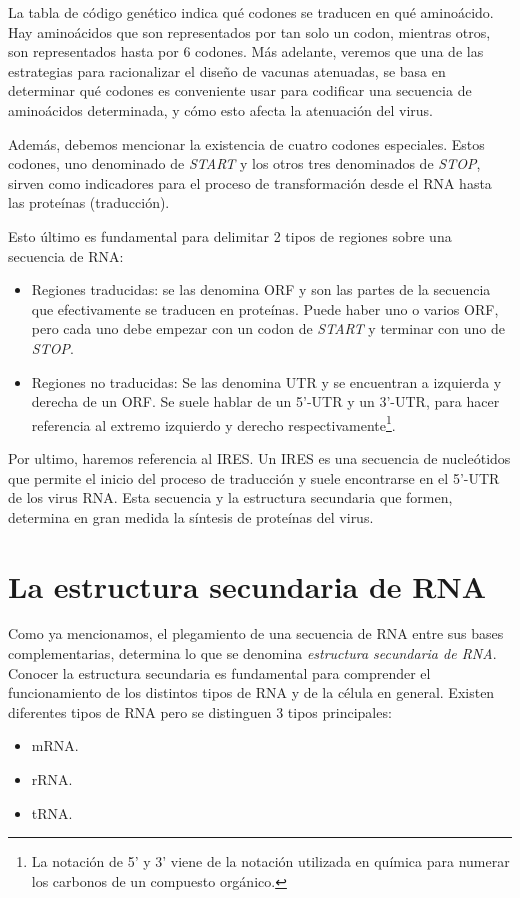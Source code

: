 La tabla de c\'odigo gen\'etico indica qu\'e codones se traducen en qu\'e
amino\'acido. Hay amino\'acidos que son representados por tan solo un codon,
mientras otros, son representados hasta por 6 codones. M\'as adelante, veremos
que una de las estrategias para racionalizar el dise\~no de vacunas atenuadas,
se basa en determinar qu\'e codones es conveniente usar para codificar una
secuencia de amino\'acidos determinada, y c\'omo esto afecta la atenuaci\'on del
virus.

Adem\'as, debemos mencionar la existencia de cuatro codones especiales. Estos
codones, uno denominado de \textit{START} y los otros tres denominados de
\textit{STOP}, sirven como indicadores para el proceso de transformaci\'on desde
el \ac{RNA} hasta las prote\'inas (traducci\'on).

Esto \'ultimo es fundamental para delimitar 2 tipos de regiones sobre una
secuencia de \ac{RNA}:
\begin{itemize}
 \item Regiones traducidas: se las denomina \ac{ORF} y son las partes de la
secuencia que efectivamente se traducen en prote\'inas. Puede haber uno o varios
\ac{ORF}, pero cada uno debe empezar con un codon de \textit{START} y terminar
con uno de \textit{STOP}.
 \item Regiones no traducidas: Se las denomina \ac{UTR} y se encuentran a
izquierda y derecha de un \ac{ORF}. Se suele hablar de un 5'-\ac{UTR} y un
3'-\ac{UTR}, para hacer referencia al extremo izquierdo y derecho
respectivamente\footnote{La notaci\'on de 5' y 3' viene de la notaci\'on
utilizada en qu\'imica para numerar los carbonos de un compuesto org\'anico.}.
\end{itemize}

Por ultimo, haremos referencia al \ac{IRES}. Un \ac{IRES} es una secuencia de
nucle\'otidos que permite el inicio del proceso de traducci\'on y suele
encontrarse en el 5'-\ac{UTR} de los virus \ac{RNA}. Esta secuencia y la
estructura secundaria que formen, determina en gran medida la s\'intesis de
prote\'inas del virus.

\section{La estructura secundaria de \ac{RNA}}
\label{estructura}
Como ya mencionamos, el plegamiento de una secuencia de \ac{RNA} entre sus bases
complementarias, determina lo que se denomina \textit{estructura secundaria de
\ac{RNA}}. Conocer la estructura secundaria es fundamental para comprender el
funcionamiento de los distintos tipos de \ac{RNA} y de la c\'elula en general.
Existen diferentes tipos de \ac{RNA} pero se distinguen 3 tipos principales: 
\begin{itemize}
 \item \ac{mRNA}.
 \item \ac{rRNA}.
 \item \ac{tRNA}. 
\end{itemize}

